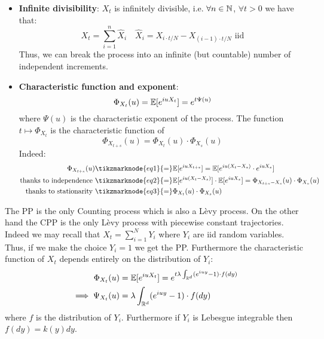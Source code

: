\begin{properties}
    $ $ \\
    \begin{itemize}
        \item \textbf{Infinite divisibility}: $X_t$ is infinitely divisible,
            i.e. $\forall n \in \mathbb{N}$, $\forall t>0$ we have that:
            \[
                X_t = \sum_{i=1}^n \hat{X}_i \quad \hat{X}_i = X_{i\cdot t/N} -
                X_{(i-1)\cdot t/N} \text{ iid}
            \]
            Thus, we can break the process into an infinite (but countable) 
            number of independent increments.
        \item \textbf{Characteristic function and exponent}: 
            \[
                \Phi_{X_t}(u) = \mathbb{E}[e^{iuX_t}] = e^{t\Psi(u)}
            \]
            where $\Psi(u)$ is the characteristic exponent of the process. The
            function $t\mapsto\Phi_{X_t}$ is the characteristic function of
            \[
                \Phi_{X_{t+s}}(u) = \Phi_{X_t}(u) \cdot \Phi_{X_s}(u)
            \]
            Indeed:
            \begin{align*}
                \Phi_{X_{t+s}}(u) & \tikzmarknode{eq1}{=} \E[e^{iuX_{t+s}}] =
                \E[e^{iu(X_t-X_s)} \cdot e^{iuX_s}] \\
                \text{thanks to independence } & \tikzmarknode{eq2}{=} 
                \E[e^{iu(X_t-X_s)}] \cdot \E[e^{iuX_s}] = \Phi_{X_{t+s}-X_s}(u)
                \cdot \Phi_{X_s}(u) \\
                \text{thanks to stationarity } & \tikzmarknode{eq3}{=}
                \Phi_{X_{t}}(u) \cdot \Phi_{X_s}(u)
            \end{align*} 
    \end{itemize}
\end{properties}

\begin{remark}
    The PP is the only Counting process which is also a Lèvy process. On the
    other hand the CPP is the only Lèvy process with piecewise constant
    trajectories. Indeed we may recall that $X_t = \sum_{i=1}^N Y_i$ where $Y_i$
    are iid random variables. Thus, if we make the choice $Y_i = 1$ we get the
    PP. Furthermore the characteristic function of $X_t$ depends entirely on the
    distribution of $Y_i$:
    \begin{align*}
        \Phi_{X_t}(u) & = \mathbb{E}[e^{iuX_t}] = e^{t\lambda \int_{\mathbb{R}^d} (e^{iuy} - 1) 
        \cdot f(dy)} \\
        \implies \Psi_{X_t}(u) & = \lambda \int_{\mathbb{R}^d} (e^{iuy} - 1) \cdot f(dy)
    \end{align*}
    where $f$ is the distribution of $Y_i$. Furthermore if $Y_i$ is Lebesgue
    integrable then $f(dy) = k(y)dy$.
\end{remark}

